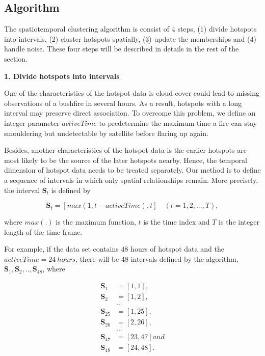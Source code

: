 \hypertarget{algorithm}{%
\subsection{Algorithm}\label{algorithm}}

The spatiotemporal clustering algorithm is consist of 4 steps, (1)
divide hotspots into intervals, (2) cluster hotspots spatially, (3)
update the memberships and (4) handle noise. These four steps will be
described in details in the rest of the section.

\textbf{1. Divide hotspots into intervals}

One of the characteristics of the hotspot data is cloud cover could lead
to missing observations of a bushfire in several hours. As a result,
hotspots with a long interval may preserve direct association. To
overcome this problem, we define an integer parameter \(activeTime\) to
predetermine the maximum time a fire can stay smouldering but
undetectable by satellite before flaring up again.

Besides, another characteristics of the hotspot data is the earlier
hotspots are most likely to be the source of the later hotspots nearby.
Hence, the temporal dimension of hotspot data needs to be treated
separately. Our method is to define a sequence of intervals in which
only spatial relationships remain. More precisely, the interval
\(\boldsymbol{S}_t\) is defined by

\[\boldsymbol{S}_t = [max(1,t-activeTime),t]\quad(t = 1,2,...,T),\]

where \(max(.)\) is the maximum function, \(t\) is the time index and
\(T\) is the integer length of the time frame.

For example, if the data set contains \(48\) hours of hotspot data and
the \(activeTime = 24~hours\), there will be \(48\) intervals defined by
the algorithm,
\(\boldsymbol{S}_1,\boldsymbol{S}_2,..,\boldsymbol{S}_{48}\), where

\begin{align*}
\boldsymbol{S}_1 &= [1,1],\\
\boldsymbol{S}_2 &= [1,2],\\
&...\\
\boldsymbol{S}_{25} &= [1,25],\\
\boldsymbol{S}_{26} &= [2,26],\\
&...\\
\boldsymbol{S}_{47} &= [23,47] and\\
\boldsymbol{S}_{48} &= [24,48].
\end{align*}


